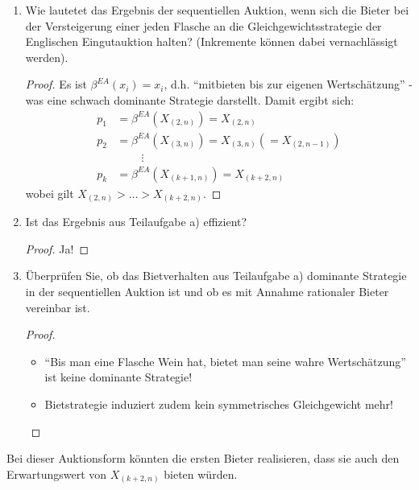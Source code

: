 \documentclass[12pt]{extreport} %
\theoremstyle{named}
\theoremstyle{itshape}
\theoremstyle{normal}
\begin{document}
\begin{enumerate}
	\item Wie lautetet das Ergebnis der sequentiellen Auktion, wenn sich die Bieter bei der Versteigerung einer jeden Flasche an die Gleichgewichtsstrategie der Englischen Eingutauktion halten? (Inkremente können dabei vernachlässigt werden).
		\begin{proof}
			Es ist $\beta^{EA}(x_i) = x_i$, d.h. \enquote{mitbieten bis zur eigenen Wertschätzung} - was eine schwach dominante Strategie darstellt. Damit ergibt sich:
			\begin{align*}
				p_1 & = \beta^{EA}\left( X_{(2,n)} \right) = X_{(2,n)} \\
				p_2 & = \beta^{EA}\left( X_{(3,n)} \right) = X_{(3,n)} \left( = X_{(2,n-1)} \right) \\
				& ~\qquad \vdots \\
				p_k & = \beta^{EA}\left( X_{(k+1, n)} \right) = X_{(k+2,n)}
			\end{align*}
			wobei gilt $X_{(2,n)} > \dotsc > X_{(k+2,n)}$.
		\end{proof}
	\item Ist das Ergebnis aus Teilaufgabe a) effizient?
		\begin{proof}
			Ja!
		\end{proof}
	\item Überprüfen Sie, ob das Bietverhalten aus Teilaufgabe a) dominante Strategie in der sequentiellen Auktion ist und ob es mit Annahme rationaler Bieter vereinbar ist.
		\begin{proof} ~\
			\begin{itemize}
				\item \enquote{Bis man eine Flasche Wein hat, bietet man seine wahre Wertschätzung} ist keine dominante Strategie!
				\item Bietstrategie induziert zudem kein symmetrisches Gleichgewicht mehr!
			\end{itemize}
		\end{proof}
\end{enumerate}

Bei dieser Auktionsform könnten die ersten Bieter realisieren, dass sie auch den Erwartungswert von $X_{(k+2,n)}$ bieten würden.

\printindex
\end{document}
